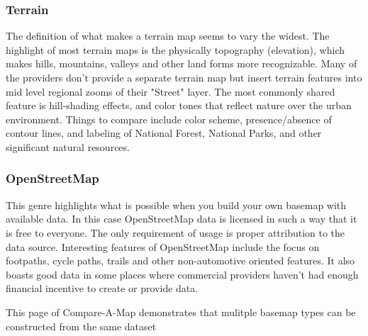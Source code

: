 \documentclass[12pt,letterpaper]{article}
\begin{document}
\subsubsection{Terrain}
The definition of what makes a terrain map seems to vary the widest. The highlight of most terrain maps is the physically topography (elevation), which makes hills, mountains, valleys and other land forms more recognizable. Many of the providers don't provide a separate terrain map but insert terrain features into mid level regional zooms of their "Street" layer. The most commonly shared feature is hill-shading effects, and color tones that reflect nature over the urban environment. Things to compare include color scheme, presence/absence of contour lines, and labeling of National Forest, National Parks, and other significant natural resources.

\subsubsection{OpenStreetMap}
This genre highlights what is possible when you build your own basemap with available data. In this case OpenStreetMap data is licensed in such a way that it is free to everyone. The only requirement of usage is proper attribution to the data source. Interesting features of OpenStreetMap include the focus on footpaths, cycle paths, trails and other non-automotive oriented features. It also boasts good data in some places where commercial providers haven't had enough financial incentive to create or provide data.

This page of Compare-A-Map demonstrates that mulitple basemap types can be constructed from the same dataset
\end{document}
